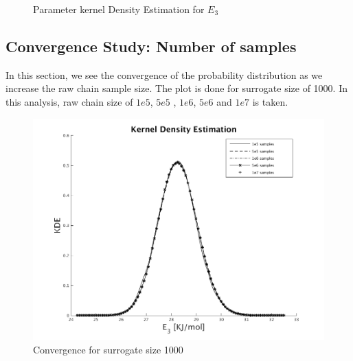   \begin{figure}[H]
  \ContinuedFloat
  \centering
{}
\caption{ Parameter  kernel Density Estimation for $E_3$}
\end{figure}
%

\subsection{Convergence Study: Number of samples }

 In this section, we see the convergence of the probability distribution as we increase the raw chain sample size. The plot is done for surrogate size of 1000. In this analysis, raw chain size of $1e5$, $5e5$ , $1e6$, $5e6$ and $1e7$ is taken.

\begin{figure}[H]
\includegraphics[scale = 0.5]{model_1/sample_conv}
    \caption{Convergence for surrogate size 1000}
\end{figure}


